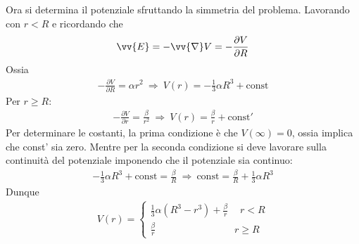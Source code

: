 \documentclass[a4paper, oneside]{article}
\begin{document}
\begin{example}
    Ora si determina il potenziale sfruttando la simmetria del problema. Lavorando con 
    $r < R$ e ricordando che
    \begin{gather*}
        \vv{E} = -\vv{\nabla}V = - \frac{\partial V}{\partial R}
    \end{gather*}
    Ossia
    \begin{gather*}
        -\frac{\partial V}{\partial R} = \alpha r^{2}  \ \Longrightarrow \ V(r) = - \frac{1}{3}\alpha R^{3} + \text{const}
    \end{gather*}
    Per $r \geq R$: 
    \begin{gather*}
        - \frac{\partial V}{\partial r} = \frac{\beta}{r^{2}} \ \Longrightarrow \ V(r) = \frac{\beta}{r} + \text{const}' 
    \end{gather*}
    Per determinare le costanti, la prima condizione è che $V(\infty ) = 0$, ossia implica che const' sia zero. Mentre 
    per la seconda condizione si deve lavorare sulla continuità del potenziale imponendo che
    il potenziale sia continuo:
    \begin{gather*}
        -\frac{1}{3} \alpha R^{3} + \text{const} = \frac{\beta}{R} \ \Longrightarrow \ \text{const} = \frac{\beta}{R} + \frac{1}{3}\alpha R^{3} 
    \end{gather*}
    Dunque
    \begin{gather*}
        V(r) = \left\{\begin{array}{l}
            \frac{1}{3}\alpha (R^{3} - r^{3}) + \frac{\beta}{r} \ \quad r < R \\
            \frac{\beta }{r} \qquad \qquad \qquad \qquad r \geq R 
        \end{array}\right.
    \end{gather*}
\end{example}
\end{document}
